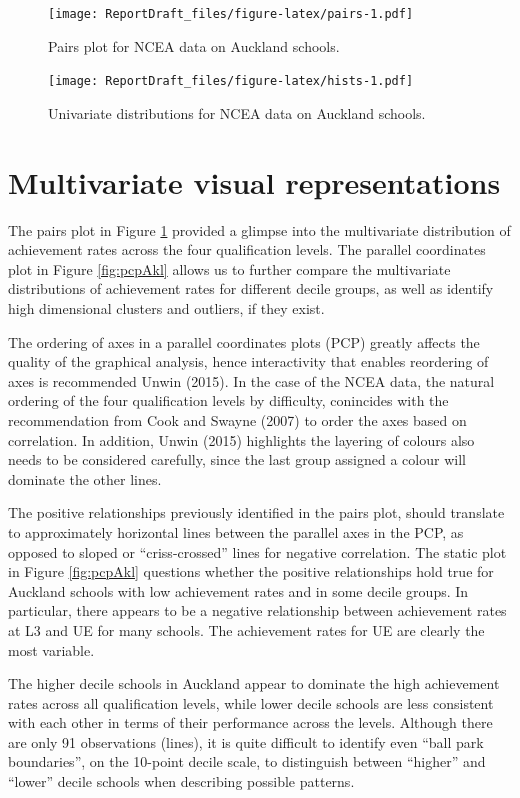 \documentclass[]{book}
\theoremstyle{definition}
\theoremstyle{definition}
\theoremstyle{definition}
\theoremstyle{remark}
\begin{document}
\begin{figure}[htbp]
\centering
\texttt{[image: ReportDraft\_files/figure-latex/pairs-1.pdf]}
\caption{\label{fig:pairs}Pairs plot for NCEA data on Auckland schools.}
\end{figure}

\begin{figure}[htbp]
\centering
\texttt{[image: ReportDraft\_files/figure-latex/hists-1.pdf]}
\caption{\label{fig:hists}Univariate distributions for NCEA data on Auckland
schools.}
\end{figure}

\section{Multivariate visual
representations}\label{multivariate-visual-representations}

The pairs plot in Figure \ref{fig:pairs} provided a glimpse into the
multivariate distribution of achievement rates across the four
qualification levels. The parallel coordinates plot in Figure
\ref{fig:pcpAkl} allows us to further compare the multivariate
distributions of achievement rates for different decile groups, as well
as identify high dimensional clusters and outliers, if they exist.

The ordering of axes in a parallel coordinates plots (PCP) greatly
affects the quality of the graphical analysis, hence interactivity that
enables reordering of axes is recommended Unwin (2015). In the case of
the NCEA data, the natural ordering of the four qualification levels by
difficulty, conincides with the recommendation from Cook and Swayne
(2007) to order the axes based on correlation. In addition, Unwin (2015)
highlights the layering of colours also needs to be considered
carefully, since the last group assigned a colour will dominate the
other lines.

The positive relationships previously identified in the pairs plot,
should translate to approximately horizontal lines between the parallel
axes in the PCP, as opposed to sloped or ``criss-crossed'' lines for
negative correlation. The static plot in Figure \ref{fig:pcpAkl}
questions whether the positive relationships hold true for Auckland
schools with low achievement rates and in some decile groups. In
particular, there appears to be a negative relationship between
achievement rates at L3 and UE for many schools. The achievement rates
for UE are clearly the most variable.

The higher decile schools in Auckland appear to dominate the high
achievement rates across all qualification levels, while lower decile
schools are less consistent with each other in terms of their
performance across the levels. Although there are only 91 observations
(lines), it is quite difficult to identify even ``ball park
boundaries'', on the 10-point decile scale, to distinguish between
``higher'' and ``lower'' decile schools when describing possible
patterns.
\end{document}
